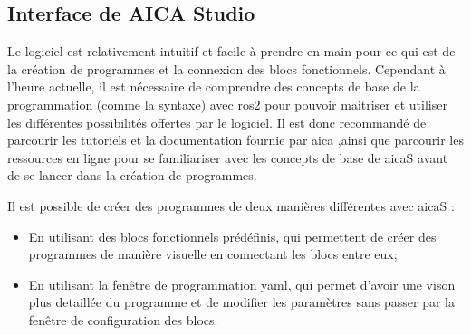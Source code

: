 \subsection{Interface de AICA Studio}
Le logiciel est relativement intuitif et facile à prendre en main pour ce qui est de la création de programmes et la connexion des blocs fonctionnels. Cependant à l'heure actuelle, il est nécessaire de comprendre des concepts de base de la programmation (comme la syntaxe) avec \gls{ros2} pour pouvoir maitriser et utiliser les différentes possibilités offertes par le logiciel. Il est donc recommandé de parcourir les tutoriels et la documentation fournie par \gls{aica} ,ainsi que parcourir les ressources en ligne pour se familiariser avec les concepts de base de \gls{aicaS} avant de se lancer dans la création de programmes.

Il est possible de créer des programmes de deux manières différentes avec \gls{aicaS} :
\begin{itemize}
    \item En utilisant des blocs fonctionnels prédéfinis, qui permettent de créer des programmes de manière visuelle en connectant les blocs entre eux;
    \item En utilisant la fenêtre de programmation \gls{yaml}, qui permet d'avoir une vison plus detaillée du programme et de modifier les paramètres sans passer par la fenêtre de configuration des blocs.
\end{itemize}

